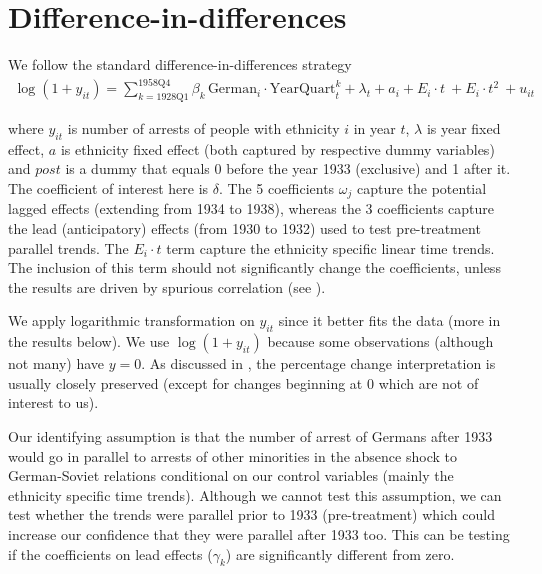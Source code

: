 \section{Difference-in-differences}

We follow the standard difference-in-differences strategy
\begin{multline}
 \log\left(1 + y_{it}\right) = \sum_{k= \text{1928Q1}}^{\text{1958Q4}} \beta_k \, \text{German}_{i} \cdot \text{YearQuart}_{t}^k + \lambda_t + a_i +  E_i \cdot t \:  + E_i \cdot t^2 \:    + u_{it}
\end{multline}

where $y_{it}$ is number of arrests of people with ethnicity $i$ in year $t$, $\lambda$ is year fixed effect, $a$ is ethnicity fixed effect (both captured by respective dummy variables) and $post$ is a dummy that equals 0 before the year 1933 (exclusive) and 1 after it. The coefficient of interest here is $\delta$. The 5 coefficients $\omega_j$ capture the potential lagged effects (extending from 1934 to 1938), whereas the 3 coefficients capture the lead (anticipatory) effects (from 1930 to 1932) used to test pre-treatment parallel trends.  The $ E_i \cdot t$ term capture the ethnicity specific linear time trends. The inclusion of this term should not significantly  change the coefficients, unless the results are driven by spurious correlation (see \citealt{angrist_mostly_2009}). 

 We apply logarithmic transformation on $y_{it}$ since it better fits the data (more in the results below).  We use $\log\left(1 + y_{it}\right)$ because some observations (although not many) have $y = 0$. As discussed in \citet[p. 193]{wooldridge_introductory_2015},  the percentage change interpretation is usually  closely preserved (except for changes beginning at 0 which are not of interest to us).   

Our identifying assumption is that the number of arrest of Germans after 1933 would go in parallel to arrests of other minorities in the absence shock to German-Soviet relations conditional on our control variables (mainly the ethnicity specific time trends). Although we cannot test this assumption, we can test whether the trends were parallel prior to 1933 (pre-treatment) which could increase our confidence that they were parallel after 1933 too. This can be testing if the coefficients on lead effects ($\gamma_k$) are significantly different from zero.  

